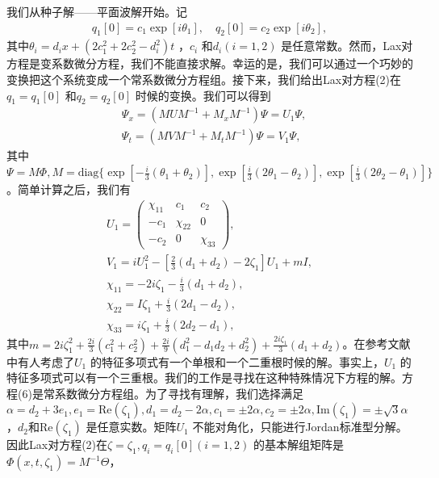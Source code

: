 \documentclass[11pt,a4paper]{ctexart}
\begin{document}
我们从种子解——平面波解开始。记
\begin{align*}
	q_{1} [0]=c_{1} \exp[i\theta_{1}],\quad q_{2} [0]=c_{2} \exp[i\theta_{2} ],\tag{5}
\end{align*}
其中$ \theta_{i} =d_{i}x+(2c_{1} ^{2} +2c_{2} ^{2} -d_{i} ^{2} )t  $ ，$ c_{i}  $ 和$ d_{i}(i=1,2)  $ 是任意常数。然而，Lax对方程是变系数微分方程，我们不能直接求解。幸运的是，我们可以通过一个巧妙的变换把这个系统变成一个常系数微分方程组。接下来，我们给出Lax对方程(2)在$ q_{1} =q_{1} [0] $ 和$ q_{2} =q_{2} [0] $ 	时候的变换。我们可以得到
\begin{align*}
	 & \Psi_{x} =(MUM^{-1} +M_{x} M^{-1} )	\Psi=U_{1} \Psi,       \\
	 & \Psi_{t} =(MVM^{-1} +M_{t} M^{-1} )\Psi=V_{1} \Psi,\tag{6}
\end{align*}
其中$ \Psi=M\Phi,M=\text{diag}\{\exp[-\frac{i}{3}(\theta_{1} +\theta_{2} )],\exp[\frac{i}{3}(2\theta_{1} -\theta_{2} )],\exp[\frac{i}{3}(2\theta_{2} -\theta_{1} )]\} $ 。简单计算之后，我们有
\begin{align*}
	U_{1} =\begin{pmatrix}
		       \chi_{11} & c_{1}     & c_{2}     \\
		       -c_{1}    & \chi_{22} & 0         \\
		       -c_{2}    & 0         & \chi_{33}
	       \end{pmatrix},                                      \\
	V_{1} =iU_{1} ^{2} -[\frac{2}{3}(d_{1} +d_{2} )-2\zeta_{1} ]U_{1} +mI,\tag{7} \\
	\chi_{11} =-2i\zeta_{1} -\frac{i}{3}(d_{1} +d_{2} ),                          \\
	\chi_{22} =I\zeta_{1} +\frac{i}{3}(2d_{1} -d_{2} ),                           \\
	\chi_{33} =i\zeta_{1} +\frac{i}{3}(2d_{2} -d_{1} ),
\end{align*}
其中$ m=2i\zeta_{1} ^{2} +\frac{2i}{3}(c_{1} ^{2} +c_{2} ^{2} )+\frac{2i}{9}(d_{1} ^{2} -d_{1} d_{2} +d_{2} ^{2} )+\frac{2i\zeta_{1} }{3}(d_{1} +d_{2} ) $。在参考文献中有人考虑了$ U_{1}  $ 的特征多项式有一个单根和一个二重根时候的解。事实上，$ U_{1}  $ 的特征多项式可以有一个三重根。我们的工作是寻找在这种特殊情况下方程的解。方程(6)是常系数微分方程组。为了寻找有理解，我们选择满足$ \alpha=d_{2} +3e_{1} ,e_{1} =\text{Re}(\zeta_{1} ),d_{1} =d_{2} -2\alpha,c_{1} =\pm 2\alpha,c_{2} =\pm 2\alpha,\text{Im}(\zeta_{1} )=\pm\sqrt{3}\alpha $，$ d_{2}  $和$ \text{Re}(\zeta_{1} ) $ 是任意实数。矩阵$ U_{1}  $ 不能对角化，只能进行Jordan标准型分解。因此Lax对方程(2)在$ \zeta=\zeta_{1} ,q_{i} =q_{i} [0](i=1,2) $ 的基本解组矩阵是$ \Phi(x,t,\zeta_{1} )=M^{-1} \Theta $，
\end{document}
